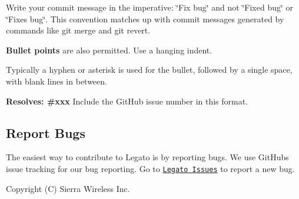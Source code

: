 Write your commit message in the imperative\+: \char`\"{}\+Fix bug\char`\"{} and not \char`\"{}\+Fixed bug\char`\"{} or \char`\"{}\+Fixes bug\char`\"{}. This convention matches up with commit messages generated by commands like git merge and git revert.


\begin{DoxyItemize}
\item {\bfseries Bullet points} are also permitted. Use a hanging indent.
\item Typically a hyphen or asterisk is used for the bullet, followed by a single space, with blank lines in between.
\end{DoxyItemize}

{\bfseries Resolves\+: \#xxx} Include the Git\+Hub issue number in this format.

\hypertarget{aboutLegatoContributing_aboutLegatoContributing_bugs}{}\subsection{Report Bugs}\label{aboutLegatoContributing_aboutLegatoContributing_bugs}
The easiest way to contribute to Legato is by reporting bugs. We use Git\+Hub\textquotesingle{}s issue tracking for our bug reporting. Go to \href{https://github.com/legatoproject/legato-af/issues}{\tt Legato Issues} to report a new bug.

Copyright (C) Sierra Wireless Inc. 